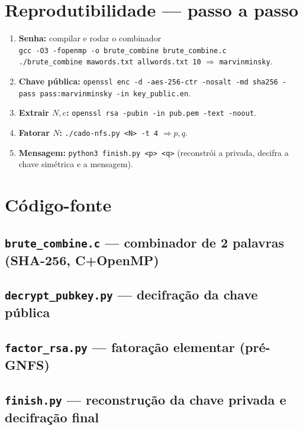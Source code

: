 \documentclass[11pt,a4paper]{article}
\begin{document}
\section{Reprodutibilidade --- passo a passo}
\begin{enumerate}[leftmargin=*,nosep]
  \item \textbf{Senha:} compilar e rodar o combinador\\
  \texttt{gcc -O3 -fopenmp -o brute\_combine brute\_combine.c}\\
  \texttt{./brute\_combine mawords.txt allwords.txt 10} $\Rightarrow$ \texttt{marvinminsky}.
  \item \textbf{Chave pública:} \texttt{openssl enc -d -aes-256-ctr -nosalt -md sha256 -pass pass:marvinminsky -in key\_public.en}.
  \item \textbf{Extrair $N,e$:} \texttt{openssl rsa -pubin -in pub.pem -text -noout}.
  \item \textbf{Fatorar $N$:} \texttt{./cado-nfs.py <N> -t 4} $\Rightarrow p,q$.
  \item \textbf{Mensagem:} \texttt{python3 finish.py <p> <q>} (reconstrói a privada, decifra a chave
  simétrica e a mensagem).
\end{enumerate}

\section{Código-fonte}
\subsection{\texttt{brute\_combine.c} --- combinador de 2 palavras (SHA-256, C+OpenMP)}


\subsection{\texttt{decrypt\_pubkey.py} --- decifração da chave pública}


\subsection{\texttt{factor\_rsa.py} --- fatoração elementar (pré-GNFS)}


\subsection{\texttt{finish.py} --- reconstrução da chave privada e decifração final}

\end{document}
